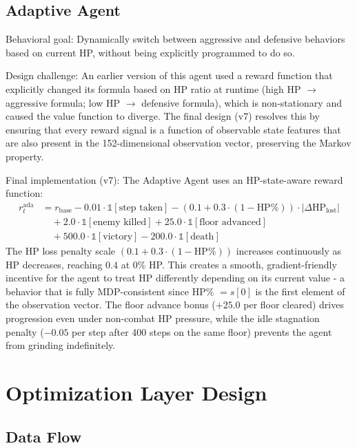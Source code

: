 \subsection{Adaptive Agent}

Behavioral goal: Dynamically switch between aggressive and defensive behaviors based on current HP, without being explicitly programmed to do so.

Design challenge: An earlier version of this agent used a reward function that explicitly changed its formula based on HP ratio at runtime (high HP $\to$ aggressive formula; low HP $\to$ defensive formula), which is non-stationary and caused the value function to diverge. The final design (v7) resolves this by ensuring that every reward signal is a function of observable state features that are also present in the 152-dimensional observation vector, preserving the Markov property.

Final implementation (v7): The Adaptive Agent uses an HP-state-aware reward function:
\begin{align}
r_t^{\text{ada}} &= r_{\text{base}} - 0.01 \cdot \mathbb{1}[\text{step taken}] - (0.1 + 0.3 \cdot (1 - \text{HP}\%)) \cdot |\Delta\text{HP}_{\text{lost}}| \nonumber \\
&\quad + 2.0 \cdot \mathbb{1}[\text{enemy killed}] + 25.0 \cdot \mathbb{1}[\text{floor advanced}] \nonumber \\
&\quad + 500.0 \cdot \mathbb{1}[\text{victory}] - 200.0 \cdot \mathbb{1}[\text{death}]
\end{align}
The HP loss penalty scale $(0.1 + 0.3 \cdot (1 - \text{HP}\%))$ increases continuously as HP decreases, reaching $0.4$ at 0\% HP. This creates a smooth, gradient-friendly incentive for the agent to treat HP differently depending on its current value - a behavior that is fully MDP-consistent since HP\% $= s[0]$ is the first element of the observation vector. The floor advance bonus ($+25.0$ per floor cleared) drives progression even under non-combat HP pressure, while the idle stagnation penalty ($-0.05$ per step after 400 steps on the same floor) prevents the agent from grinding indefinitely.

\section{Optimization Layer Design}

\subsection{Data Flow}

